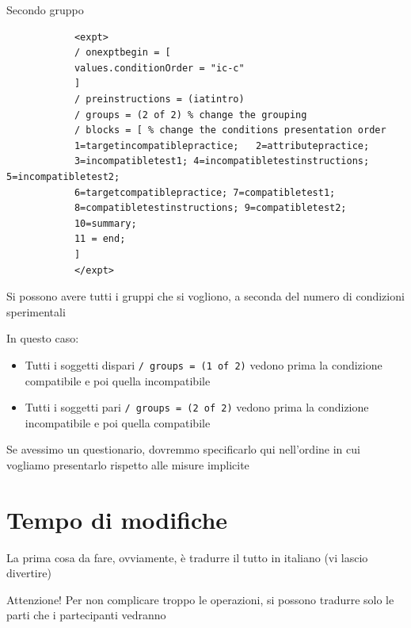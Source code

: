 \documentclass{beamer}
\begin{document}
\begin{frame}[fragile]{Secondo gruppo}
	\begin{small}
		\begin{verbatim}
			<expt>
			/ onexptbegin = [
			values.conditionOrder = "ic-c"
			]
			/ preinstructions = (iatintro)
			/ groups = (2 of 2) % change the grouping
			/ blocks = [ % change the conditions presentation order
			1=targetincompatiblepractice; 	2=attributepractice; 
			3=incompatibletest1; 4=incompatibletestinstructions; 5=incompatibletest2; 
			6=targetcompatiblepractice; 7=compatibletest1; 
			8=compatibletestinstructions; 9=compatibletest2; 
			10=summary;
			11 = end;
			]
			</expt>
		\end{verbatim}
	\end{small}
\end{frame}

\begin{frame}
	Si possono avere tutti i gruppi che si vogliono, a seconda del numero di condizioni sperimentali 
	
	In questo caso: 
	
	\begin{itemize}
		\item Tutti i soggetti dispari \texttt{/ groups = (1 of 2)} vedono prima la condizione compatibile e poi quella incompatibile
			\item Tutti i soggetti pari \texttt{/ groups = (2 of 2)} vedono prima la condizione incompatibile e poi quella compatibile
	\end{itemize}

Se avessimo un questionario, dovremmo specificarlo qui nell'ordine in cui vogliamo presentarlo rispetto alle misure implicite
\end{frame}

\section*{Tempo di modifiche}

\begin{frame}
	La prima cosa da fare, ovviamente, è tradurre il tutto in italiano (vi lascio divertire)
	
	Attenzione! Per non complicare troppo le operazioni, si possono tradurre solo le parti che i partecipanti vedranno
	 
\end{frame}
\end{document}
